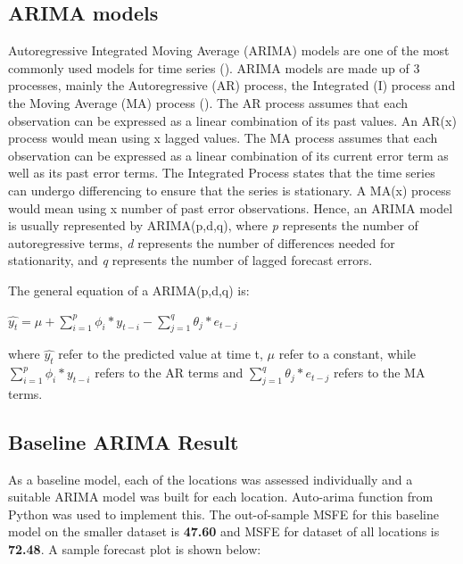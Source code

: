 \documentclass[12pt, letterpaper] {article}
\begin{document}
\subsection{ARIMA models}
Autoregressive Integrated Moving Average (ARIMA) models are one of the most commonly used models for time series (\cite{Asha2016}). ARIMA models are made up of 3 processes, mainly the Autoregressive (AR) process, the Integrated (I) process and the Moving Average (MA) process (\cite{Jamal2018}). The AR process assumes that each observation can be expressed as a linear combination of its past values.  An AR(x) process would mean using x lagged values. The MA process assumes that each observation can be expressed as a linear combination of its current error term as well as its past error terms. The Integrated Process states that the time series can undergo differencing to ensure that the series is stationary. A MA(x) process would mean using x number of past error observations. Hence, an ARIMA model is usually represented by ARIMA(p,d,q), where \textit{p} represents the number of autoregressive terms, \textit{d} represents the number of differences needed for stationarity, and \textit{q} represents the number of lagged forecast errors. 

\noindent The general equation of a ARIMA(p,d,q) is: 
\begin{center}
$\hat{y_t} = \mu + \sum_{i=1}^{p} \phi_i * y_{t-i} - \sum_{j=1}^{q} \theta_j * e_{t-j}$
\end{center}

\noindent where $\hat{y_t}$ refer to the predicted value at time t, $\mu$ refer to a constant, while $\sum_{i=1}^{p} \phi_i * y_{t-i}$ refers to the AR terms and $\sum_{j=1}^{q} \theta_j * e_{t-j}$ refers to the MA terms.

\subsection{Baseline ARIMA Result}
As a baseline model, each of the locations was assessed individually and a suitable ARIMA model was built for each location. Auto-arima function from Python was used to implement this. The out-of-sample MSFE for this baseline model on the smaller dataset is \textbf{47.60} and MSFE for dataset of all locations is \textbf{72.48}. A sample forecast plot is shown below:
\end{document}
